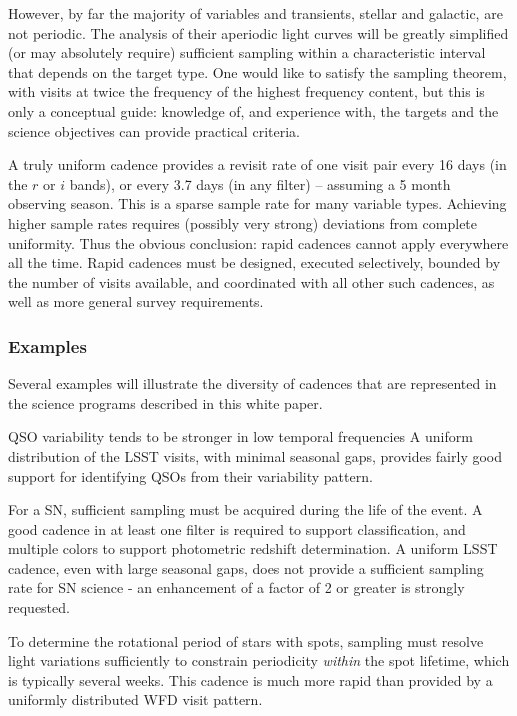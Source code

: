 However, by far the majority of variables and transients, stellar and galactic,
are not periodic. The analysis of their aperiodic light curves will be greatly simplified (or may
absolutely require) sufficient sampling within a characteristic interval that depends
on the target type. One would like to satisfy the sampling theorem, with
visits at twice the frequency of the highest frequency content, but this
is only a conceptual guide: knowledge of, and experience with, the
targets and the science objectives can provide practical criteria.

A truly uniform cadence provides a revisit rate of one visit pair every
16 days (in the $r$ or $i$ bands), or every 3.7 days (in any filter) --
assuming a 5 month observing season.  This is a sparse sample rate for
many variable types.  Achieving higher sample rates requires (possibly
very strong) deviations from complete uniformity.  Thus the obvious
conclusion: rapid cadences cannot apply everywhere all the time. Rapid
cadences must be designed, executed selectively, bounded by the number
of visits available, and coordinated with all other such cadences, as
well as more general survey requirements.

\subsubsection{Examples}

Several examples will illustrate the diversity of cadences that are
represented in the science programs described in this white paper.

QSO variability tends to be stronger in low temporal frequencies   A uniform distribution of the
LSST visits, with minimal seasonal gaps, provides fairly good support
for identifying QSOs from their variability pattern.

For a SN, sufficient sampling must be acquired during the life of the
event. A good cadence in at least one filter is required to support
classification, and multiple colors to support photometric redshift
determination.  A uniform LSST cadence, even with large seasonal gaps,
does not provide a sufficient sampling rate for SN science - an
enhancement of a factor of 2 or greater is strongly requested.

To determine the rotational period of stars with spots, sampling must
resolve light variations sufficiently to constrain periodicity {\it
within} the spot lifetime, which is typically several weeks. This
cadence is much more rapid than provided by a uniformly distributed WFD
visit pattern.

